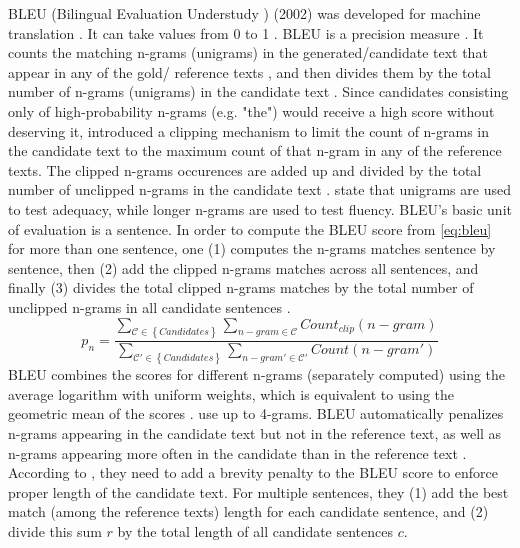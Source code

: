BLEU (Bilingual Evaluation Understudy \cite{palivela_optimization_2021,zhou_paraphrase_2025,papineni_bleu_2001}) (2002) 
was developed for machine translation \cite{zhou_paraphrase_2021,papineni_bleu_2001}.
It can take values from 0 to 1 \cite{papineni_bleu_2001}.
BLEU is a precision measure \cite{kurt_pehlivanoglu_comparative_2024,papineni_bleu_2001}.
It counts the matching n-grams (unigrams) in the generated/candidate text that appear in any of the gold/ reference texts \cite{palivela_optimization_2021,papineni_bleu_2001}, 
and then divides them by the total number of n-grams (unigrams) in the candidate text \cite{papineni_bleu_2001}.
Since candidates consisting only of high-probability n-grams (e.g. "the") would receive a high score without deserving it, 
\citet{papineni_bleu_2001} introduced a clipping mechanism to limit the count of n-grams in the candidate text to the maximum count of that n-gram in any of the reference texts.
The clipped n-grams occurences are added up and divided by the total number of unclipped n-grams in the candidate text \cite{papineni_bleu_2001}.
\citet{papineni_bleu_2001} state that unigrams are used to test adequacy, while longer n-grams are used to test fluency.
BLEU's basic unit of evaluation is a sentence. 
In order to compute the BLEU score from \autoref{eq:bleu} for more than one sentence, one (1) computes the n-grams matches sentence by sentence, 
then (2) add the clipped n-grams matches across all sentences, 
and finally (3) divides the total clipped n-grams matches by the total number of unclipped n-grams in all candidate sentences \cite{papineni_bleu_2001}.
\begin{equation}
    p_n = \frac{\sum_{\mathcal{C} \in \left\{ Candidates \right\}}\sum_{n-gram \in\mathcal{C}}Count_{clip}(n-gram)}{\sum_{\mathcal{C'} \in \left\{ Candidates \right\}}\sum_{n-gram' \in\mathcal{C'}}Count(n-gram')}
\label{eq:bleu}
\end{equation}
BLEU combines the scores for different n-grams (separately computed) using the average logarithm with uniform weights, 
which is equivalent to using the geometric mean of the scores \cite{papineni_bleu_2001,banerjee_METEOR_2005}.
\citet{gohsen_captions_2023} use up to 4-grams.
BLEU automatically penalizes n-grams appearing in the candidate text but not in the reference text, as well as n-grams appearing more often in the candidate than in the reference text \cite{papineni_bleu_2001}.
According to \citet{papineni_bleu_2001}, they need to add a brevity penalty to the BLEU score to enforce proper length of the candidate text. 
For multiple sentences, they (1) add the best match (among the reference texts) length for each candidate sentence, and (2) divide this sum $r$ by the total length of all candidate sentences $c$. 
